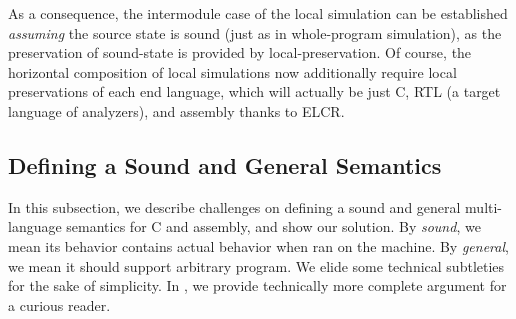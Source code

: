 {As a consequence, the intermodule case of the local simulation can be
established \emph{assuming} the source state is sound (just as in
whole-program simulation), as the preservation of sound-state is
provided by local-preservation. Of course, the horizontal composition
of local simulations now additionally require local preservations of
each end language, which will actually be just C, RTL (a target
language of analyzers), and assembly thanks to ELCR.






















\subsection{Defining a Sound and General Semantics}\label{sec:overview:semantics}
In this subsection, we describe challenges on defining a sound and general multi-language semantics for C and assembly, and show our solution.
By \textit{sound}, we mean its behavior contains actual behavior when ran on the machine.
By \textit{general}, we mean it should support arbitrary program.
We elide some technical subtleties for the sake of simplicity.
In , we provide technically more complete argument for a curious reader.

}
